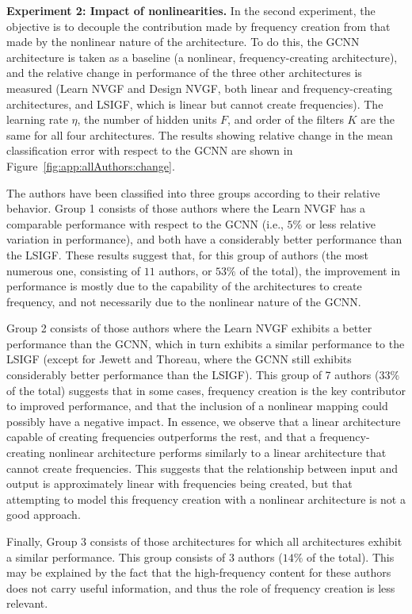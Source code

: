 \textbf{Experiment 2: Impact of nonlinearities.} In the second experiment, the objective is to decouple the contribution made by frequency creation from that made by the nonlinear nature of the architecture. To do this, the GCNN architecture is taken as a baseline (a nonlinear, frequency-creating architecture), and the relative change in performance of the three other architectures is measured (Learn NVGF and Design NVGF, both linear and frequency-creating architectures, and LSIGF, which is linear but cannot create frequencies). The learning rate $\eta$, the number of hidden units $F$, and order of the filters $K$ are the same for all four architectures. The results showing relative change in the mean classification error with respect to the GCNN are shown in Figure~\ref{fig:app:allAuthors:change}.

The authors have been classified into three groups according to their relative behavior. Group 1 consists of those authors where the Learn NVGF has a comparable performance with respect to the GCNN (i.e., $5\%$ or less relative variation in performance), and both have a considerably better performance than the LSIGF. These results suggest that, for this group of authors (the most numerous one, consisting of $11$ authors, or $53\%$ of the total), the improvement in performance is mostly due to the capability of the architectures to create frequency, and not necessarily due to the nonlinear nature of the GCNN.

Group 2 consists of those authors where the Learn NVGF exhibits a better performance than the GCNN, which in turn exhibits a similar performance to the LSIGF (except for Jewett and Thoreau, where the GCNN still exhibits considerably better performance than the LSIGF). This group of 7 authors ($33\%$ of the total) suggests that in some cases, frequency creation is the key contributor to improved performance, and that the inclusion of a nonlinear mapping could possibly have a negative impact. In essence, we observe that a linear architecture capable of creating frequencies outperforms the rest, and that a frequency-creating nonlinear architecture performs similarly to a linear architecture that cannot create frequencies. This suggests that the relationship between input and output is approximately linear with frequencies being created, but that attempting to model this frequency creation with a nonlinear architecture is not a good approach.

Finally, Group 3 consists of those architectures for which all architectures exhibit a similar performance. This group consists of $3$ authors ($14\%$ of the total). This may be explained by the fact that the high-frequency content for these authors does not carry useful information, and thus the role of frequency creation is less relevant.

